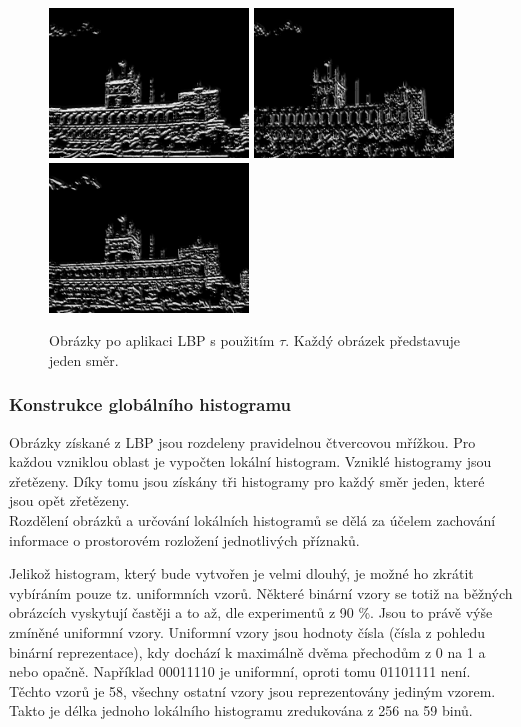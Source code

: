 \documentclass[czech,BP]{thesiskiv}
\begin{document}
\begin{figure}[ht]
	\centering
	\includegraphics[width=150pt]{./img/lbp1_tau.jpg}
	\includegraphics[width=150pt]{./img/lbp2_tau.jpg}
	\includegraphics[width=150pt]{./img/lbp3_tau.jpg}
	\caption{Obrázky po aplikaci LBP s použitím $\tau$. Každý obrázek představuje jeden směr.}
\end{figure}

\subsubsection{Konstrukce globálního histogramu}
Obrázky získané z LBP jsou rozdeleny pravidelnou čtvercovou mřížkou. Pro každou vzniklou oblast je vypočten lokální histogram. Vzniklé histogramy jsou zřetězeny. Díky tomu jsou získány tři histogramy pro každý směr jeden, které jsou opět zřetězeny. \\
Rozdělení obrázků a určování lokálních histogramů se dělá za účelem zachování informace o prostorovém rozložení jednotlivých příznaků.

Jelikož histogram, který bude vytvořen je velmi dlouhý, je možné ho zkrátit vybíráním pouze tz. uniformních vzorů. Některé binární vzory se totiž na běžných obrázcích vyskytují častěji a to až, dle experimentů z 90 \%. Jsou to právě výše zmíněné uniformní vzory. Uniformní vzory jsou hodnoty čísla (čísla z pohledu binární reprezentace), kdy dochází k maximálně dvěma přechodům z 0 na 1 a nebo opačně. Například 00011110 je uniformní, oproti tomu 01101111 není. Těchto vzorů je 58, všechny ostatní vzory jsou reprezentovány jediným vzorem. Takto je délka jednoho lokálního histogramu zredukována z 256 na 59 binů.
 
\end{document}
